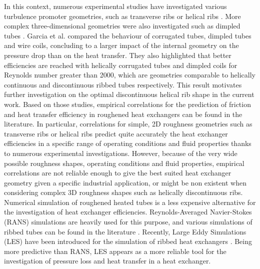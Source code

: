 In this context, numerous experimental studies have investigated various turbulence promoter geometries, such as transverse ribs \cite{webb1971, aliaga1994} or helical ribs \cite{gee1980, VicenteGarciaViedma2004, cheng2006, Mayo2016}. More complex three-dimensional geometries were also investigated such as dimpled tubes \cite{VicenteGarciaViedma2002}. Garcia et al. \cite{GarciaSolanoVicenteEtAl2012} compared the behaviour of corrugated tubes, dimpled tubes and wire coils, concluding to a larger impact of the internal geometry on the pressure drop than on the heat transfer. They also highlighted that better efficiencies are reached with helically corrugated tubes and dimpled coils for Reynolds number greater than 2000, which are geometries comparable to helically continuous and discontinuous ribbed tubes respectively. This result motivates further investigation on the optimal discontinuous helical rib shape in the current work. Based on those studies, empirical correlations for the prediction of friction and heat transfer efficiency in roughened heat exchangers can be found in the literature. In particular, correlations for simple, 2D roughness geometries such as transverse ribs or helical ribs predict quite accurately the heat exchanger efficiencies in a specific range of operating conditions and fluid properties thanks to numerous experimental investigations. However, because of the very wide possible roughness shapes, operating conditions and fluid properties, empirical correlations are not reliable enough to give the best suited heat exchanger geometry given a specific industrial application, or might be non existent when considering complex 3D roughness shapes such as helically discontinuous ribs.\\

Numerical simulation of roughened heated tubes is a less expensive alternative for the investigation of heat exchanger efficiencies. Reynolds-Averaged Navier-Stokes (RANS) simulations are heavily used for this purpose, and various simulations of ribbed tubes can be found in the literature \cite{liou1993, shub1993, liu2001, ooi2002, iaccarino2002, liou2002, kim2004, kim_hm2004, ryu2007_a, ryu2007_b, kamali2008, eiamsaard2008, agra2011, ma2012}. Recently, Large Eddy Simulations (LES) have been introduced for the simulation of ribbed heat exchangers \cite{jordan2003, vijiapurapu2007, vijiapurapu2010, Zhu2015, campet2018}. Being more predictive than RANS, LES appears as a more reliable tool for the investigation of pressure loss and heat transfer in a heat exchanger.\\ 

